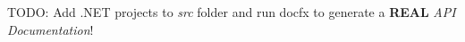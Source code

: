 TODO\+: Add .NET projects to {\itshape src} folder and run {\ttfamily docfx} to generate a {\bfseries{REAL}} {\itshape API Documentation}! 